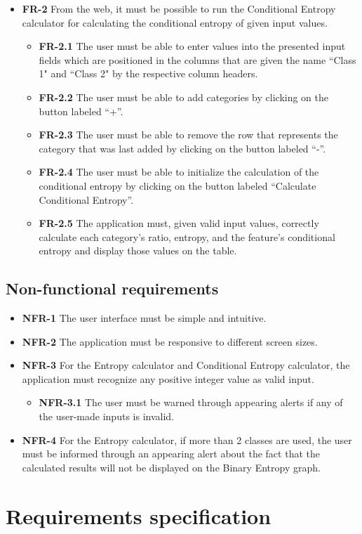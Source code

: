 \begin{itemize}
    \item \textbf{FR-2} From the web, it must be possible to run the Conditional Entropy calculator for calculating the conditional entropy of given input values.
    \begin{itemize}
        \item \textbf{FR-2.1} The user must be able to enter values into the presented input fields which are positioned in the columns that are given the name ``Class 1" and ``Class 2" by the respective column headers.
        \item \textbf{FR-2.2} The user must be able to add categories by clicking on the button labeled ``+''.
        \item \textbf{FR-2.3} The user must be able to remove the row that represents the category that was last added by clicking on the button labeled ``-''.
        \item \textbf{FR-2.4} The user must be able to initialize the calculation of the conditional entropy by clicking on the button labeled ``Calculate Conditional Entropy''.
        \item \textbf{FR-2.5} The application must, given valid input values, correctly calculate each category's ratio, entropy, and the feature's conditional entropy and display those values on the table.
    \end{itemize}
\end{itemize}

\subsection{Non-functional requirements}
\begin{itemize}
    \item \textbf{NFR-1} The user interface must be simple and intuitive.
    \item \textbf{NFR-2} The application must be responsive to different screen sizes.
    \item \textbf{NFR-3} For the Entropy calculator and Conditional Entropy calculator, the application must recognize any positive integer value as valid input.
    \begin{itemize}
        \item \textbf{NFR-3.1} The user must be warned through appearing alerts if any of the user-made inputs is invalid.
    \end{itemize}
    \item \textbf{NFR-4} For the Entropy calculator, if more than 2 classes are used, the user must be informed through an appearing alert about the fact that the calculated results will not be displayed on the Binary Entropy graph.
\end{itemize}

\section{Requirements specification}
